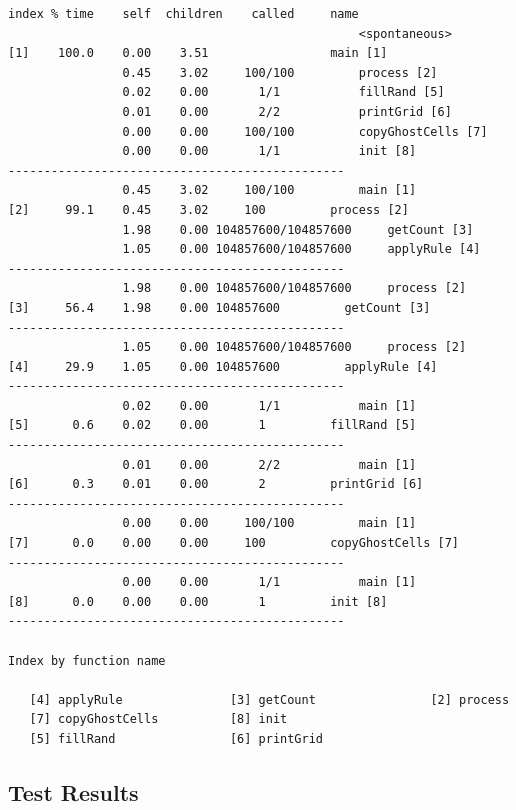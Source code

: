 \documentclass[11pt]{article} %
\begin{document}
\begin{verbatim}
index % time    self  children    called     name
                                                 <spontaneous>
[1]    100.0    0.00    3.51                 main [1]
                0.45    3.02     100/100         process [2]
                0.02    0.00       1/1           fillRand [5]
                0.01    0.00       2/2           printGrid [6]
                0.00    0.00     100/100         copyGhostCells [7]
                0.00    0.00       1/1           init [8]
-----------------------------------------------
                0.45    3.02     100/100         main [1]
[2]     99.1    0.45    3.02     100         process [2]
                1.98    0.00 104857600/104857600     getCount [3]
                1.05    0.00 104857600/104857600     applyRule [4]
-----------------------------------------------
                1.98    0.00 104857600/104857600     process [2]
[3]     56.4    1.98    0.00 104857600         getCount [3]
-----------------------------------------------
                1.05    0.00 104857600/104857600     process [2]
[4]     29.9    1.05    0.00 104857600         applyRule [4]
-----------------------------------------------
                0.02    0.00       1/1           main [1]
[5]      0.6    0.02    0.00       1         fillRand [5]
-----------------------------------------------
                0.01    0.00       2/2           main [1]
[6]      0.3    0.01    0.00       2         printGrid [6]
-----------------------------------------------
                0.00    0.00     100/100         main [1]
[7]      0.0    0.00    0.00     100         copyGhostCells [7]
-----------------------------------------------
                0.00    0.00       1/1           main [1]
[8]      0.0    0.00    0.00       1         init [8]
-----------------------------------------------

Index by function name

   [4] applyRule               [3] getCount                [2] process
   [7] copyGhostCells          [8] init
   [5] fillRand                [6] printGrid

\end{verbatim}
\endgroup
\subsection*{Test Results}
\end{document}
